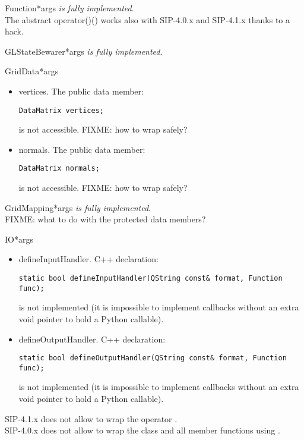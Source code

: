 \documentclass{manual}
\begin{document}
\begin{classdesc}{Function}{*args}
\emph{is fully implemented}.\\
The abstract operator()() works also with SIP-4.0.x and SIP-4.1.x thanks to
a hack.
\end{classdesc}

\begin{classdesc}{GLStateBewarer}{*args}
\emph{is fully implemented}.
\end{classdesc}

\begin{classdesc}{GridData}{*args}
  \begin{itemize}
  \item{vertices}. The public data member:
\begin{verbatim}
DataMatrix vertices;
\end{verbatim}
    is not accessible. FIXME: how to wrap  safely?
  \item{normals}. The public data member:
\begin{verbatim}
DataMatrix normals;
\end{verbatim}
    is not accessible. FIXME: how to wrap  safely?
  \end{itemize}
\end{classdesc}

\begin{classdesc}{GridMapping}{*args}
\emph{is fully implemented}.\\
FIXME: what to do with the protected data members?
\end{classdesc}

\begin{classdesc}{IO}{*args}
  \begin{itemize}
  \item{defineInputHandler}. C++ declaration:
\begin{verbatim}
static bool defineInputHandler(QString const& format, Function func);
\end{verbatim}
    is not implemented (it is impossible to implement callbacks without an
    extra void pointer to hold a Python callable).
  \item{defineOutputHandler}. C++ declaration:
\begin{verbatim}
static bool defineOutputHandler(QString const& format, Function func);
\end{verbatim}
    is not implemented (it is impossible to implement callbacks without an
    extra void pointer to hold a Python callable).
  \end{itemize}
  SIP-4.1.x does not allow to wrap the operator
  .\\
  SIP-4.0.x does not allow to wrap the class  and all member
  functions using .
\end{classdesc}
\end{document}
